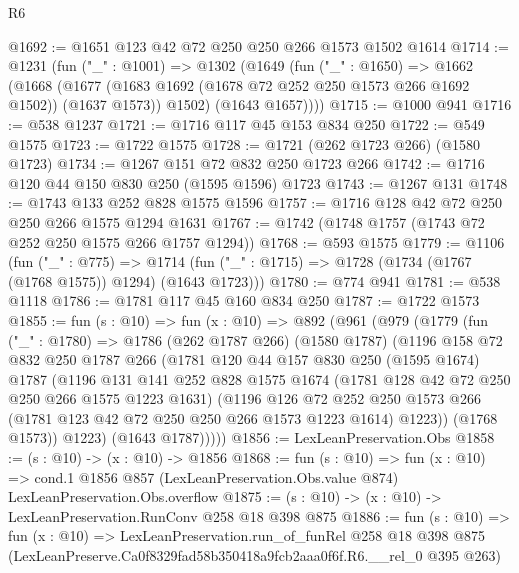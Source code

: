 \begin{lexlean}{R6}
\begin{coremodule}
@1692 := @1651 @123 @42 @72 @250 @250 @266 @1573 @1502 @1614
@1714 := @1231
    (fun ("_" : @1001) =>
    @1302
      (@1649
        (fun ("_" : @1650) =>
        @1662
          (@1668
            (@1677 (@1683 @1692 (@1678 @72 @252 @250 @1573 @266 @1692 @1502)) (@1637 @1573))
            @1502)
          (@1643 @1657))))
@1715 := @1000 @941
@1716 := @538 @1237
@1721 := @1716 @117 @45 @153 @834 @250
@1722 := @549 @1575
@1723 := @1722 @1575
@1728 := @1721 (@262 @1723 @266) (@1580 @1723)
@1734 := @1267 @151 @72 @832 @250 @1723 @266
@1742 := @1716 @120 @44 @150 @830 @250 (@1595 @1596) @1723
@1743 := @1267 @131
@1748 := @1743 @133 @252 @828 @1575 @1596
@1757 := @1716 @128 @42 @72 @250 @250 @266 @1575 @1294 @1631
@1767 := @1742 (@1748 @1757 (@1743 @72 @252 @250 @1575 @266 @1757 @1294))
@1768 := @593 @1575
@1779 := @1106
    (fun ("_" : @775) =>
    @1714 (fun ("_" : @1715) => @1728 (@1734 (@1767 (@1768 @1575)) @1294) (@1643 @1723)))
@1780 := @774 @941
@1781 := @538 @1118
@1786 := @1781 @117 @45 @160 @834 @250
@1787 := @1722 @1573
@1855 := fun (s : @10) =>
  fun (x : @10) =>
  @892
    (@961
      (@979
        (@1779
          (fun ("_" : @1780) =>
          @1786
            (@262 @1787 @266)
            (@1580 @1787)
            (@1196
              @158
              @72
              @832
              @250
              @1787
              @266
              (@1781
                @120
                @44
                @157
                @830
                @250
                (@1595 @1674)
                @1787
                (@1196
                  @131
                  @141
                  @252
                  @828
                  @1575
                  @1674
                  (@1781 @128 @42 @72 @250 @250 @266 @1575 @1223 @1631)
                  (@1196
                    @126
                    @72
                    @252
                    @250
                    @1573
                    @266
                    (@1781 @123 @42 @72 @250 @250 @266 @1573 @1223 @1614)
                    @1223))
                (@1768 @1573))
              @1223)
            (@1643 @1787)))))
@1856 := LexLeanPreservation.Obs
@1858 := (s : @10) -> (x : @10) -> @1856
@1868 := fun (s : @10) =>
  fun (x : @10) =>
  cond.{1} @1856 @857 (LexLeanPreservation.Obs.value @874) LexLeanPreservation.Obs.overflow
@1875 := (s : @10) -> (x : @10) -> LexLeanPreservation.RunConv @258 @18 @398 @875
@1886 := fun (s : @10) =>
  fun (x : @10) =>
  LexLeanPreservation.run_of_funRel
    @258
    @18
    @398
    @875
    (LexLeanPreserve.Ca0f8329fad58b350418a9fcb2aaa0f6f.R6.__rel_0 @395 @263)
\end{coremodule}
\end{lexlean}

